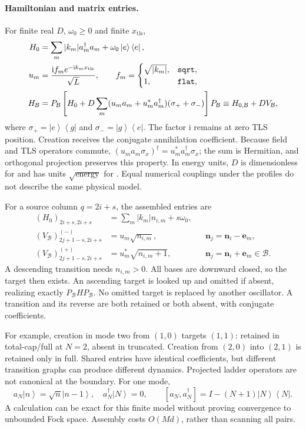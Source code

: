 \documentclass[11pt,a4paper]{article}
\newcommand{\ket}[1]{\left|#1\right\rangle}
\newcommand{\bra}[1]{\left\langle#1\right|}
\newcommand{\ii}{\mathrm{i}}
\newcommand{\code}[1]{\texttt{\detokenize{#1}}}
\newcommand{\B}{\mathcal B}
\begin{document}
\paragraph{Hamiltonian and matrix entries.}
For finite real $D$, $\omega_0\geq0$ and finite $x_{\mathrm{tls}}$,
\begin{align}
 H_0&=\sum_m |k_m|a_m^\dagger a_m+\omega_0\ket e\bra e,\\
 u_m&=\frac{\ii f_m e^{-\ii k_mx_{\mathrm{tls}}}}{\sqrt L},\qquad
 f_m=\begin{cases}\sqrt{|k_m|},&\code{sqrt},\\1,&\code{flat},\end{cases}\\
 H_\B&=P_\B\left[H_0+D\sum_m(u_ma_m+u_m^*a_m^\dagger)
                         (\sigma_++\sigma_-)\right]P_\B
       \equiv H_{0,\B}+DV_\B,
 \label{eq:H}
\end{align}
where $\sigma_+=\ket e\bra g$ and $\sigma_-=\ket g\bra e$.
The factor $\ii$ remains at zero TLS position. Creation receives the conjugate
annihilation coefficient. Because field and TLS operators commute,
$(u_ma_m\sigma_x)^\dagger=u_m^*a_m^\dagger\sigma_x$; the sum is Hermitian,
and orthogonal projection preserves this property. In energy units, $D$
is dimensionless for \code{sqrt} and has units $\sqrt{\text{energy}}$ for
\code{flat}. Equal numerical couplings under the profiles do not describe
the same physical model.

For a source column $q=2i+s$, the assembled entries are
\begin{align}
 (H_0)_{2i+s,2i+s}&=\sum_m|k_m|n_{i,m}+s\omega_0,\\
 (V_\B)_{2j+1-s,2i+s}^{(-)}&=u_m\sqrt{n_{i,m}},
       &&\bm n_j=\bm n_i-\bm e_m,\\
 (V_\B)_{2j+1-s,2i+s}^{(+)}&=u_m^*\sqrt{n_{i,m}+1},
       &&\bm n_j=\bm n_i+\bm e_m\in\B.
 \label{eq:entries}
\end{align}
A descending transition needs $n_{i,m}>0$. All bases are downward closed,
so the target then exists. An ascending target is looked up and omitted if
absent, realizing exactly $P_\B H P_\B$. No omitted target is replaced by
another oscillator. A transition and its reverse are both retained or both
absent, with conjugate coefficients.

For example, creation in mode two from $(1,0)$ targets $(1,1)$: retained
in total-cap/full at $N=2$, absent in truncated. Creation from $(2,0)$ into
$(2,1)$ is retained only in full. Shared entries have identical coefficients,
but different transition graphs can produce different dynamics.
Projected ladder operators are not canonical at the boundary. For one mode,
\begin{equation}
 a_N\ket n=\sqrt n\ket{n-1},\quad a_N^\dagger\ket N=0,\qquad
 [a_N,a_N^\dagger]=I-(N+1)\ket N\bra N.
 \label{eq:boundary}
\end{equation}
A calculation can be exact for this finite model without proving convergence
to unbounded Fock space. Assembly costs $O(Md)$, rather than scanning all pairs.
\end{document}
